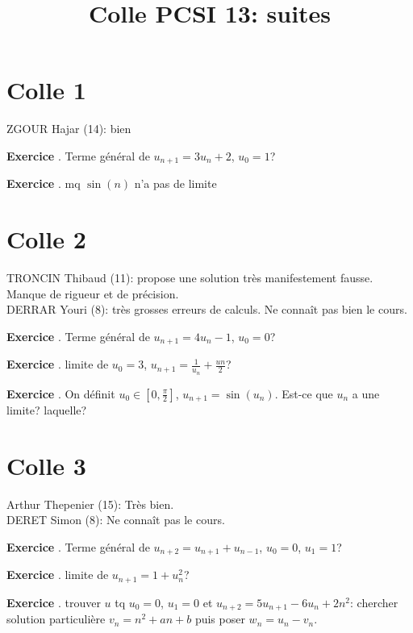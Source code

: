 \documentclass[10pt,a4paper]{article}
\title{Colle PCSI 13: suites}
\newcounter{question}
\newcounter{exo}
\newenvironment{exo}{\vspace{0.5cm}\setcounter{question}{0}\addtocounter{exo}{1} \noindent \textbf{Exercice \theexo}. \normalsize }{\par}
\begin{document}
	\maketitle

	\section*{Colle 1}
	ZGOUR Hajar (14): bien\\
	
	\begin{exo}
		Terme général de $u_{n+1} = 3 u_n + 2$, $u_0 = 1$?
	\end{exo}	
	
	\begin{exo}
		mq $\sin(n)$ n'a pas de limite
	\end{exo}
	
	\section*{Colle 2}
	\setcounter{exo}{0}
	TRONCIN Thibaud (11): propose une solution très manifestement fausse. Manque de rigueur et de précision. \\
	DERRAR Youri (8): très grosses erreurs de calculs. Ne connaît pas bien le cours.\\
	
	\begin{exo}
		Terme général de $u_{n+1} = 4 u_n - 1$, $u_0 = 0$?
	\end{exo}

	\begin{exo}
		limite de $u_0 = 3$, $u_{n+1} = \frac{1}{u_n} + \frac{un}{2}$?
	\end{exo}
	
	\begin{exo}
		On définit $u_0 \in [0, \frac{\pi}{2}]$, $u_{n+1} = \sin(u_n)$. Est-ce que $u_n$ a une limite? laquelle?
	\end{exo}
	
	\section*{Colle 3}
	\setcounter{exo}{0}
	Arthur Thepenier (15): Très bien.\\
	DERET Simon (8): Ne connaît pas le cours.\\
	
	\begin{exo}
		Terme général de $u_{n+2} = u_{n+1} + u_{n-1}$, $u_0 = 0$, $u_1 = 1$?
	\end{exo}	

	\begin{exo}
		limite de $u_{n+1} = 1 + u_n^2$?
	\end{exo}
	
	\begin{exo}
		trouver $u$ tq $u_0 =0$, $u_1 = 0$ et $u_{n+2} = 5u_{n+1} - 6u_n + 2n^2$: chercher solution particulière $v_n = n^2 + an + b$ puis poser $w_n = u_n - v_n$.
	\end{exo}		
\end{document}
